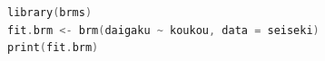 \begin{lstlisting}[language=c++,label={code:27_04},caption={ベイズ推定してみる}]
library(brms)
fit.brm <- brm(daigaku ~ koukou, data = seiseki)
print(fit.brm)
\end{lstlisting}
